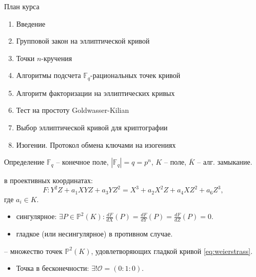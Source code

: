\documentclass{beamer}
\begin{document}
\begin{frame}{План курса}
\begin{enumerate}
    \item Введение
    \item Групповой закон на эллиптической кривой
    \item Точки $n$-кручения
    \item Алгоритмы подсчета $\mathbb{F}_q$-рациональных точек кривой
    \item Алгоритм факторизации на эллиптических кривых
    \item Тест на простоту Goldwasser-Kilian
    \item Выбор эллиптической кривой для криптографии
    \item Изогении. Протокол обмена ключами на изогениях
\end{enumerate}
\end{frame}

\begin{frame}{Определение}
    $\mathbb{F}_q$ -- конечное поле, $|\mathbb{F}_q| = q = p^n$, $K$ -- поле, $\overline{K}$ -- алг. замыкание.
    
     в проективных координатах: 
        \begin{equation}
            \label{eq:weierstrass}
            F: Y^2Z + a_1 X Y Z + a_3 Y Z^2 = X^3 + a_2 X^2 Z + a_4 X Z^2 + a_6 Z^3,
        \end{equation}
        где $a_i \in K$.
        \begin{itemize}
            \item \textcolor{struct-color}{сингулярное}: $\exists P \in \mathbb{P}^2(K): \frac{dF}{dX}(P) = \frac{dF}{dY}(P) = \frac{dF}{dZ}(P) = 0$.
            \item  \textcolor{struct-color}{гладкое} (или несингулярное) в противном случае.
        \end{itemize}
     -- множество точек $\mathbb{P}^2(K)$, удовлетворяющих гладкой кривой \eqref{eq:weierstrass}.
        
    \begin{itemize}
        \item Точка в бесконечности: $\exists! \mathcal{O} = (0: 1: 0)$.
    \end{itemize}
\end{frame}
\end{document}
